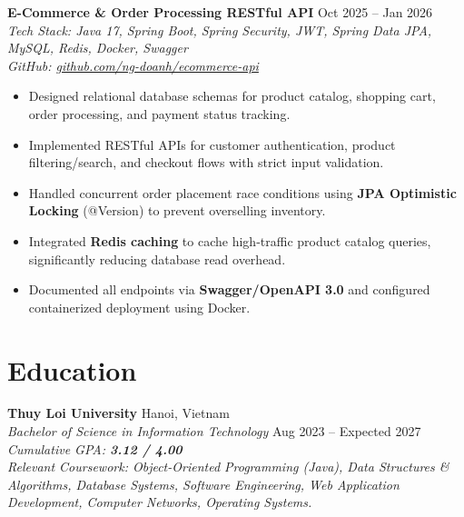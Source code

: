 ﻿\documentclass[10pt,a4paper]{article}
\begin{document}
\textbf{E-Commerce \& Order Processing RESTful API} \hfill Oct 2025 -- Jan 2026 \\
\textit{Tech Stack: Java 17, Spring Boot, Spring Security, JWT, Spring Data JPA, MySQL, Redis, Docker, Swagger} \\
\textit{GitHub: \href{https://github.com/ng-doanh/ecommerce-api}{github.com/ng-doanh/ecommerce-api}}
\begin{itemize}[leftmargin=1.2em, itemsep=1.8pt, topsep=2pt]
    \item Designed relational database schemas for product catalog, shopping cart, order processing, and payment status tracking.
    \item Implemented RESTful APIs for customer authentication, product filtering/search, and checkout flows with strict input validation.
    \item Handled concurrent order placement race conditions using \textbf{JPA Optimistic Locking} (@Version) to prevent overselling inventory.
    \item Integrated \textbf{Redis caching} to cache high-traffic product catalog queries, significantly reducing database read overhead.
    \item Documented all endpoints via \textbf{Swagger/OpenAPI 3.0} and configured containerized deployment using Docker.
\end{itemize}

\section{Education}
\textbf{Thuy Loi University} \hfill Hanoi, Vietnam \\
\textit{Bachelor of Science in Information Technology} \hfill Aug 2023 -- Expected 2027 \\
\textit{Cumulative GPA: \textbf{3.12 / 4.00}} \\
{\small \textit{Relevant Coursework: Object-Oriented Programming (Java), Data Structures \& Algorithms, Database Systems, Software Engineering, Web Application Development, Computer Networks, Operating Systems.}}
\end{document}
